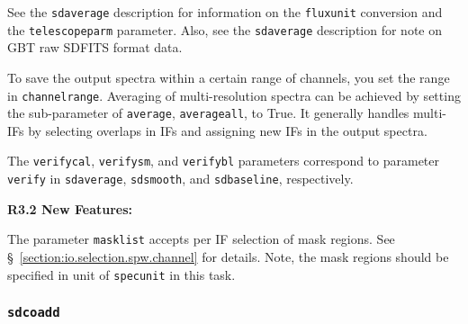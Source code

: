     See the {\tt sdaverage} description for information on the {\tt fluxunit} 
    conversion and the {\tt telescopeparm} parameter.
    Also, see the {\tt sdaverage} description for note on GBT raw SDFITS format data.

    To save the output spectra within a certain range of 
    channels, you set the range in {\tt channelrange}. 
    Averaging of multi-resolution
    spectra can be achieved by setting the sub-parameter of {\tt average}, {\tt averageall}, 
    to True. It generally handles multi-IFs by selecting overlaps in IFs and assigning
    new IFs in the output spectra. 

The {\tt verifycal}, {\tt verifysm}, and {\tt verifybl}  parameters correspond to parameter
    {\tt  verify} in {\tt sdaverage}, {\tt sdsmooth}, and {\tt sdbaseline}, respectively. 
    

\medskip
{\bf R3.2 New Features:}

The parameter {\tt masklist} accepts per IF selection of mask regions. 
See \S~\ref{section:io.selection.spw.channel} for details. 
Note, the mask regions should be specified in unit of {\tt specunit} 
in this task.



\subsubsection{{\tt sdcoadd}}
\label{section:sd.sdtasks.tasks.sdcoadd}

